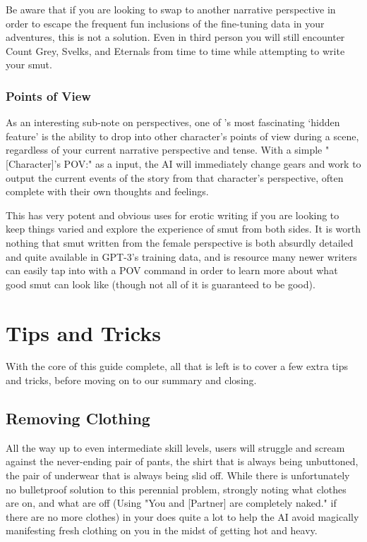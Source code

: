 ﻿\documentclass[Coomer-main.tex]{subfiles}
\begin{document}
Be aware that if you are looking to swap to another narrative perspective in order to escape the frequent fun inclusions of the fine-tuning data in your adventures, this is not a solution.
Even in third person you will still encounter Count Grey, Svelks, and Eternals from time to time while attempting to write your smut.

\subsection{Points of View}

As an interesting sub-note on perspectives, one of \aid's most fascinating ‘hidden feature’ is the ability to drop into other character's points of view during a scene, regardless of your current narrative perspective and tense.
With a simple "[Character]'s POV:" as a \story  input, the AI will immediately change gears and work to output the current events of the story from that character's perspective, often complete with their own thoughts and feelings.

This has very potent and obvious uses for erotic writing if you are looking to keep things varied and explore the experience of smut from both sides.
It is worth nothing that smut written from the female perspective is both absurdly detailed and quite available in GPT-3's training data, and is resource many newer writers can easily tap into with a POV command in order to learn more about what good smut can look like (though not all of it is guaranteed to be good).

\chapter{Tips and Tricks}
\label{ch:tips}

With the core of this guide complete, all that is left is to cover a few extra tips and tricks, before moving on to our summary and closing.

\section{Removing Clothing}

All the way up to even intermediate skill levels, users will struggle and scream against the never-ending pair of pants, the shirt that is always being unbuttoned, the pair of underwear that is always being slid off.
While there is unfortunately no bulletproof solution to this perennial problem, strongly noting what clothes are on, and what are off (Using "You and [Partner] are completely naked." if there are no more clothes) in your \rem does quite a lot to help the AI avoid magically manifesting fresh clothing on you in the midst of getting hot and heavy.
\end{document}

